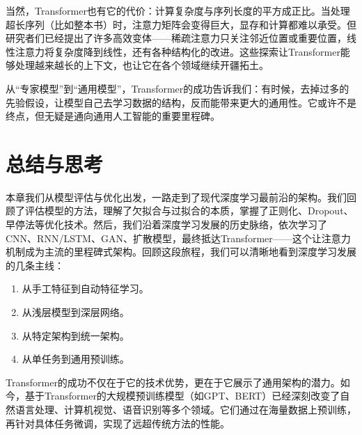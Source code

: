 \documentclass[lang=cn,zihao=-4,a4paper,fontset=windows]{beautybook}
\begin{document}
当然，Transformer也有它的代价：计算复杂度与序列长度的平方成正比。当处理超长序列（比如整本书）时，注意力矩阵会变得巨大，显存和计算都难以承受。但研究者们已经提出了许多高效变体——稀疏注意力只关注邻近位置或重要位置，线性注意力将复杂度降到线性，还有各种结构化的改进。这些探索让Transformer能够处理越来越长的上下文，也让它在各个领域继续开疆拓土。

从“专家模型”到“通用模型”，Transformer的成功告诉我们：有时候，去掉过多的先验假设，让模型自己去学习数据的结构，反而能带来更大的通用性。它或许不是终点，但无疑是通向通用人工智能的重要里程碑。

\section{总结与思考}

本章我们从模型评估与优化出发，一路走到了现代深度学习最前沿的架构。我们回顾了评估模型的方法，理解了欠拟合与过拟合的本质，掌握了正则化、Dropout、早停法等优化技术。然后，我们沿着深度学习发展的历史脉络，依次学习了CNN、RNN/LSTM、GAN、扩散模型，最终抵达Transformer——这个让注意力机制成为主流的里程碑式架构。回顾这段旅程，我们可以清晰地看到深度学习发展的几条主线：
\begin{enumerate}
\item  从手工特征到自动特征学习。
\item 从浅层模型到深层网络。
\item 从特定架构到统一架构。
        \item 从单任务到通用预训练。
\end{enumerate}
Transformer的成功不仅在于它的技术优势，更在于它展示了通用架构的潜力。如今，基于Transformer的大规模预训练模型（如GPT、BERT）已经深刻改变了自然语言处理、计算机视觉、语音识别等多个领域。它们通过在海量数据上预训练，再针对具体任务微调，实现了远超传统方法的性能。


\end{document}
